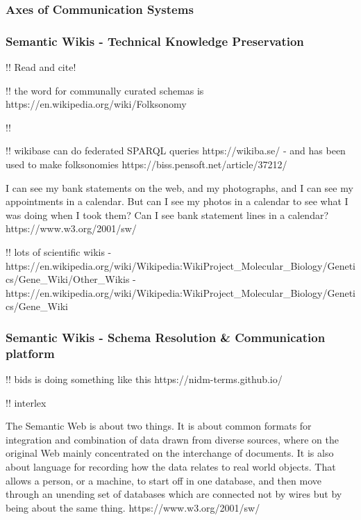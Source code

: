 \documentclass[10pt]{article}
\begin{document}
\begin{multicols}{2}
\hypertarget{axes-of-communication-systems}{%
\subsubsection{Axes of Communication
Systems}\label{axes-of-communication-systems}}

\hypertarget{semantic-wikis---technical-knowledge-preservation}{%
\subsubsection{Semantic Wikis - Technical Knowledge
Preservation}\label{semantic-wikis---technical-knowledge-preservation}}

\cite{kamelboulosSemanticWikisComprehensible2009} 

!! Read and cite! \cite{classeDistributedInfrastructureSupport2017} 

!! the word for communally curated schemas is
https://en.wikipedia.org/wiki/Folksonomy

!! \cite{goodSocialTaggingLife2009} 

!! wikibase can do federated SPARQL queries https://wikiba.se/ - and has
been used to make folksonomies https://biss.pensoft.net/article/37212/

\begin{leftbar}
I can see my bank statements on the web, and my photographs, and I can
see my appointments in a calendar. But can I see my photos in a calendar
to see what I was doing when I took them? Can I see bank statement lines
in a calendar? https://www.w3.org/2001/sw/
\end{leftbar}

!! lots of scientific wikis -
https://en.wikipedia.org/wiki/Wikipedia:WikiProject\_Molecular\_Biology/Genetics/Gene\_Wiki/Other\_Wikis
-
https://en.wikipedia.org/wiki/Wikipedia:WikiProject\_Molecular\_Biology/Genetics/Gene\_Wiki

\hypertarget{semantic-wikis---schema-resolution-communication-platform}{%
\subsubsection{Semantic Wikis - Schema Resolution \& Communication
platform}\label{semantic-wikis---schema-resolution-communication-platform}}

!! bids is doing something like this https://nidm-terms.github.io/

!! interlex

\begin{leftbar}
The Semantic Web is about two things. It is about common formats for
integration and combination of data drawn from diverse sources, where on
the original Web mainly concentrated on the interchange of documents. It
is also about language for recording how the data relates to real world
objects. That allows a person, or a machine, to start off in one
database, and then move through an unending set of databases which are
connected not by wires but by being about the same thing.
https://www.w3.org/2001/sw/
\end{leftbar}


\end{multicols}
\end{document}
